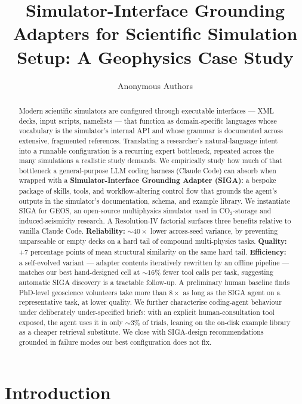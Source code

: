 \documentclass{article}
\title{Simulator-Interface Grounding Adapters for Scientific Simulation Setup: A Geophysics Case Study}
\author{%
  Anonymous Authors\\
}
\begin{document}
\maketitle


\begin{abstract}
Modern scientific simulators are configured through executable interfaces --- XML decks, input scripts, namelists --- that function as domain-specific languages whose vocabulary is the simulator's internal API and whose grammar is documented across extensive, fragmented references. Translating a researcher's natural-language intent into a runnable configuration is a recurring expert bottleneck, repeated across the many simulations a realistic study demands. We empirically study how much of that bottleneck a general-purpose LLM coding harness (Claude Code) can absorb when wrapped with a \textbf{Simulator-Interface Grounding Adapter (SIGA)}: a bespoke package of skills, tools, and workflow-altering control flow that grounds the agent's outputs in the simulator's documentation, schema, and example library. We instantiate SIGA for GEOS, an open-source multiphysics simulator used in CO$_2$-storage and induced-seismicity research. A Resolution-IV factorial surfaces three benefits relative to vanilla Claude Code. \textbf{Reliability:} ${\sim}40{\times}$ lower across-seed variance, by preventing unparseable or empty decks on a hard tail of compound multi-physics tasks. \textbf{Quality:} $+7$ percentage points of mean structural similarity on the same hard tail. \textbf{Efficiency:} a self-evolved variant --- adapter contents iteratively rewritten by an offline pipeline --- matches our best hand-designed cell at ${\sim}16\%$ fewer tool calls per task, suggesting automatic SIGA discovery is a tractable follow-up. A preliminary human baseline finds PhD-level geoscience volunteers take more than $8\times$ as long as the SIGA agent on a representative task, at lower quality. We further characterise coding-agent behaviour under deliberately under-specified briefs: with an explicit human-consultation tool exposed, the agent uses it in only ${\sim}3\%$ of trials, leaning on the on-disk example library as a cheaper retrieval substitute. We close with SIGA-design recommendations grounded in failure modes our best configuration does not fix.
\end{abstract}


\section{Introduction}
\label{sec:intro}
\end{document}
